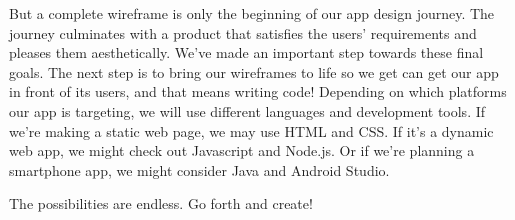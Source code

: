         But a complete wireframe is only the beginning of our app design journey. The journey culminates with a product that satisfies the users’ requirements and pleases them aesthetically. We’ve made an important step towards these final goals. The next step is to bring our wireframes to life so we get can get our app in front of its users, and that means writing code! Depending on which platforms our app is targeting, we will use different languages and development tools. If we’re making a static web page, we may use HTML and CSS. If it’s a dynamic web app, we might check out Javascript and Node.js. Or if we’re planning a smartphone app, we might consider Java and Android Studio.

        The possibilities are endless. Go forth and create!